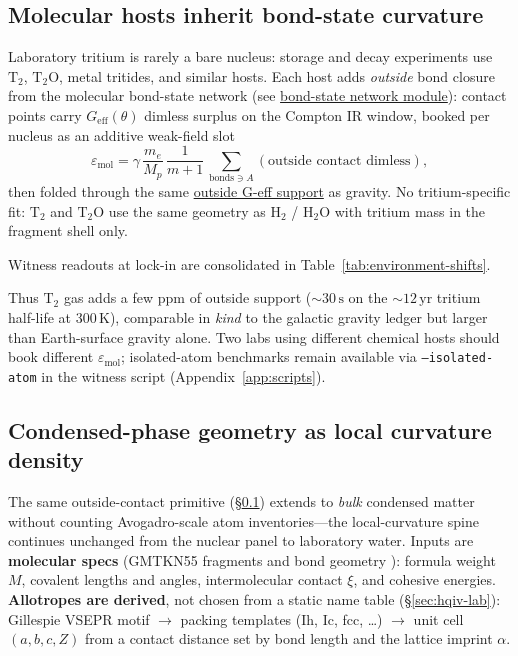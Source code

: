 \documentclass[11pt,notitlepage]{amsart}
\begin{document}
\subsection{Molecular hosts inherit bond-state curvature}
\label{sec:molecular-host}

Laboratory tritium is rarely a bare nucleus: storage and decay experiments use
$\mathrm{T_2}$, $\mathrm{T_2O}$, metal tritides, and similar hosts. Each host
adds \emph{outside} bond closure from the molecular bond-state network
(see \hyperref[lean:bond-state-network]{bond-state network module}): contact points carry $G_{\mathrm{eff}}(\theta)$ dimless surplus on the
Compton IR window, booked per nucleus as an additive weak-field slot
\[
  \varepsilon_{\mathrm{mol}}
    = \gamma\,\frac{m_e}{M_p}\,\frac{1}{m+1}\,
      \sum_{\mathrm{bonds}\ni A}\!(\text{outside contact dimless}),
\]
then folded through the same \hyperref[lean:geff-outside]{outside G-eff support}
as gravity. No tritium-specific fit: $\mathrm{T_2}$ and $\mathrm{T_2O}$ use the
same geometry as $\mathrm{H_2}$ / $\mathrm{H_2O}$ with tritium mass in the
fragment shell only.

Witness readouts at lock-in are consolidated in Table~\ref{tab:environment-shifts}.

Thus $\mathrm{T_2}$ gas adds a few ppm of outside support ($\sim 30\,\mathrm{s}$ on
the $\sim 12\,\mathrm{yr}$ tritium half-life at 300\,K), comparable in \emph{kind} to
the galactic gravity ledger but larger than Earth-surface gravity alone. Two labs
using different chemical hosts should book different $\varepsilon_{\mathrm{mol}}$;
isolated-atom benchmarks remain available via \texttt{--isolated-atom} in the
witness script (Appendix~\ref{app:scripts}).

\subsection{Condensed-phase geometry as local curvature density}
\label{sec:phase-geometry-density}

The same outside-contact primitive (\S\ref{sec:molecular-host}) extends to
\emph{bulk} condensed matter without counting Avogadro-scale atom inventories---the
local-curvature spine continues unchanged from the nuclear panel to laboratory water.
Inputs are \textbf{molecular specs} (GMTKN55 fragments and bond geometry
\cite{goerigk2017gmtkn55,nistwebbook_h2o}): formula weight $M$, covalent lengths and
angles, intermolecular contact $\xi$, and cohesive energies.
\textbf{Allotropes are derived}, not chosen from a static name table
(\S\ref{sec:hqiv-lab}): Gillespie VSEPR motif \cite{gillespie1970vsepr}
$\rightarrow$ packing templates (Ih, Ic, fcc, \ldots) $\rightarrow$ unit cell
$(a,b,c,Z)$ from a contact distance set by bond length and the lattice imprint $\alpha$.
\end{document}
